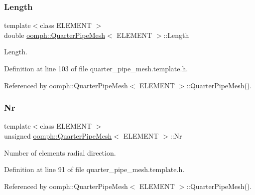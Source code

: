\subsubsection{\texorpdfstring{Length}{Length}}
{\footnotesize\ttfamily template$<$class E\+L\+E\+M\+E\+NT $>$ \\
double \hyperlink{classoomph_1_1QuarterPipeMesh}{oomph\+::\+Quarter\+Pipe\+Mesh}$<$ E\+L\+E\+M\+E\+NT $>$\+::Length\hspace{0.3cm}{\ttfamily [protected]}}



Length. 



Definition at line 103 of file quarter\+\_\+pipe\+\_\+mesh.\+template.\+h.



Referenced by oomph\+::\+Quarter\+Pipe\+Mesh$<$ E\+L\+E\+M\+E\+N\+T $>$\+::\+Quarter\+Pipe\+Mesh().

\mbox{\label{classoomph_1_1QuarterPipeMesh_a8e6896852024ecf017ab687926fb3ef3}} 
\subsubsection{\texorpdfstring{Nr}{Nr}}
{\footnotesize\ttfamily template$<$class E\+L\+E\+M\+E\+NT $>$ \\
unsigned \hyperlink{classoomph_1_1QuarterPipeMesh}{oomph\+::\+Quarter\+Pipe\+Mesh}$<$ E\+L\+E\+M\+E\+NT $>$\+::Nr\hspace{0.3cm}{\ttfamily [protected]}}



Number of elements radial direction. 



Definition at line 91 of file quarter\+\_\+pipe\+\_\+mesh.\+template.\+h.



Referenced by oomph\+::\+Quarter\+Pipe\+Mesh$<$ E\+L\+E\+M\+E\+N\+T $>$\+::\+Quarter\+Pipe\+Mesh().

\mbox{\label{classoomph_1_1QuarterPipeMesh_aabe271e163f56d913936d12d2c4d0f21}} 
